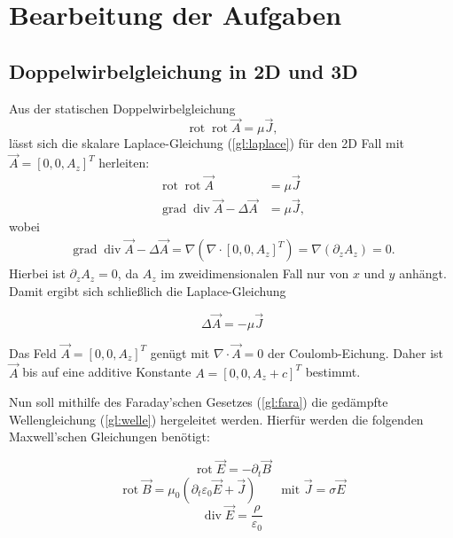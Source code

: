 \chapter{Bearbeitung der Aufgaben}
\section{Doppelwirbelgleichung in 2D und 3D}

Aus der statischen Doppelwirbelgleichung
\begin{equation}
\label{gl:dw}
\operatorname{rot}\operatorname{rot}\vec{A} = \mu\vec{J},
\end{equation}
lässt sich die skalare Laplace-Gleichung (\ref{gl:laplace})  für den 2D Fall mit $\vec{A} = [0,0,A_z]^T$ herleiten:
\begin{align*}
\operatorname{rot}\operatorname{rot}\vec{A} &= \mu\vec{J} \\
\operatorname{grad}\operatorname{div}\vec{A} - \Delta\vec{A} &= \mu\vec{J},
\end{align*}
wobei
\begin{align*}
\operatorname{grad}\operatorname{div}\vec{A} - \Delta\vec{A} = \nabla\left(\nabla \cdot [0,0,A_z]^T \right)
= \nabla (\partial_z A_z) = 0.
\end{align*}
Hierbei ist $\partial_z A_z = 0$, da $A_z$ im zweidimensionalen Fall nur von $x$ und $y$ anhängt. Damit ergibt sich schließlich die Laplace-Gleichung

\begin{equation}
\label{gl:laplace}
\Delta\vec{A} = -\mu\vec{J}
\end{equation}

Das Feld $\vec{A} = [0,0,A_z]^T$ genügt mit $\nabla \cdot \vec{A} = 0$ der Coulomb-Eichung. Daher ist $\vec{A}$ bis auf eine additive Konstante $A = [0,0,A_z+c]^T$ bestimmt.

Nun soll mithilfe des Faraday'schen Gesetzes (\ref{gl:fara}) die gedämpfte Wellengleichung (\ref{gl:welle}) hergeleitet werden. Hierfür werden die folgenden Maxwell'schen Gleichungen benötigt:

\begin{equation}
\label{gl:fara}
\operatorname{rot}\vec{E} = -\partial_t\vec{B}
\end{equation}
\begin{equation}
\label{gl:max2}
\operatorname{rot}\vec{B} = \mu_0\left(\partial_t\varepsilon_0\vec{E} + \vec{J}\right) \qquad \text{mit } \vec{J} = \sigma\vec{E}
\end{equation}
\begin{equation}
\label{gl:max3}
\operatorname{div}\vec{E} = \frac{\rho}{\varepsilon_0}
\end{equation}

